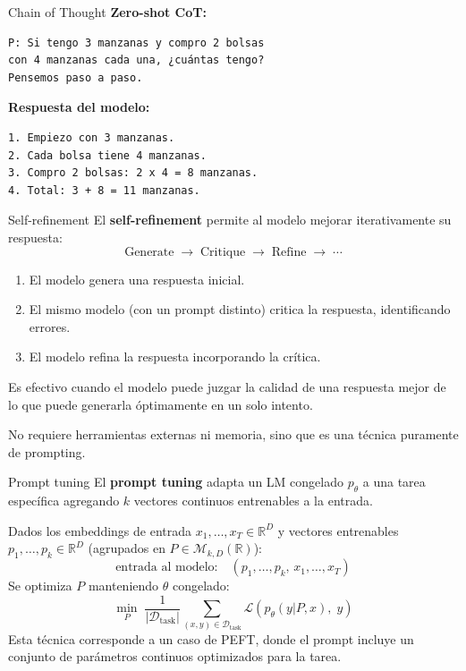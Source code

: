 \documentclass{beamer}
\newcommand{\R}{\mathbb{R}}
\begin{document}
\begin{frame}[fragile]{Chain of Thought}
    \footnotesize
    \textbf{Zero-shot CoT:}
    \begin{verbatim}
P: Si tengo 3 manzanas y compro 2 bolsas
con 4 manzanas cada una, ¿cuántas tengo?
Pensemos paso a paso.
    \end{verbatim}
    \textbf{Respuesta del modelo:}
    \begin{verbatim}
1. Empiezo con 3 manzanas.
2. Cada bolsa tiene 4 manzanas.
3. Compro 2 bolsas: 2 x 4 = 8 manzanas.
4. Total: 3 + 8 = 11 manzanas.
    \end{verbatim}
\end{frame}

\begin{frame}{Self-refinement}
    El \textbf{self-refinement} permite al modelo mejorar iterativamente su respuesta:
    \begin{equation*}
        \text{Generate}\;\to\;\text{Critique}\;\to\;\text{Refine}\;\to\;\cdots
    \end{equation*}
    \begin{enumerate}
        \item El modelo genera una respuesta inicial.
        \item El mismo modelo (con un prompt distinto) critica la respuesta, identificando errores.
        \item El modelo refina la respuesta incorporando la crítica.
    \end{enumerate}
    Es efectivo cuando el modelo puede juzgar la calidad de una respuesta mejor de lo que puede generarla óptimamente en un solo intento.

    No requiere herramientas externas ni memoria, sino que es una técnica puramente de prompting.
\end{frame}

\begin{frame}{Prompt tuning}
    El \textbf{prompt tuning} adapta un LM congelado $p_\theta$ a una tarea específica agregando $k$ vectores continuos entrenables a la entrada.

    Dados los embeddings de entrada $x_1,\ldots,x_T\in\R^D$ y vectores entrenables $p_1,\ldots,p_k\in\R^D$ (agrupados en $P\in\mathcal{M}_{k,D}(\R)$):
    \begin{equation*}
        \text{entrada al modelo:}\quad (p_1,\ldots,p_k,\,x_1,\ldots,x_T)
    \end{equation*}
    Se optimiza $P$ manteniendo $\theta$ congelado:
    \begin{equation*}
        \min_{P}\;\frac{1}{|\mathcal{D}_\text{task}|}\sum_{(x,y)\in\mathcal{D}_\text{task}}\mathcal{L}\!\left(p_\theta(y| P,x),\;y\right)
    \end{equation*}
    Esta técnica corresponde a un caso de PEFT, donde el prompt incluye un conjunto de parámetros continuos optimizados para la tarea.
\end{frame}
\end{document}
